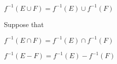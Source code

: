 \documentclass[12pt]{article}
\newenvironment{problem}[2][Problem]{\begin{trivlist} \item[\hskip \labelsep {\bfseries #1}\hskip \labelsep {\bfseries #2.}]}{\end{trivlist}}
\newenvironment{solution}[2][Solution]{\begin{trivlist} \item[\hskip \labelsep {\bfseries #1}\hskip \labelsep {\bfseries #2.}]}{\end{trivlist}}
\begin{document}
\begin{problem}{12}
\begin{enumerate}[label=(\alph*)]
\begin{solution}{(c)}
    \end{solution}
	\item $f^{-1}(E\cup F) = f^{-1}(E)\cup f^{-1}(F)$
	  \begin{solution}{(d)}
	    Suppose that 
    \end{solution}
	\item $f^{-1}(E\cap F) = f^{-1}(E)\cap f^{-1}(F)$
	  \begin{solution}{(d)}
    \end{solution}
	\item $f^{-1}(E- F) = f^{-1}(E)- f^{-1}(F)$
	  \begin{solution}{(d)}
    \end{solution}
	
    \end{enumerate}
    \end{problem}
 
\end{document}
